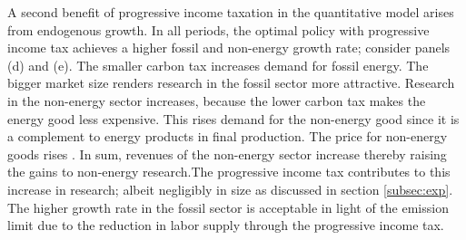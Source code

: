 A second benefit of progressive income taxation in the quantitative model arises from endogenous growth. 
In all periods, the optimal policy with progressive income tax achieves a higher fossil and non-energy growth rate; consider panels (d) and (e).
The smaller carbon tax increases demand for fossil energy. The bigger market size renders research in the fossil sector more attractive. Research in the non-energy sector increases, because the lower carbon tax makes the energy good less expensive. This rises demand for the non-energy good since it is a complement to energy products in final production. The price for non-energy goods rises . In sum, revenues of the non-energy sector increase thereby raising the gains to non-energy research.The progressive income tax contributes to this increase in research; albeit negligibly in size as discussed in section \ref{subsec:exp}.  The higher growth rate in the fossil sector is acceptable in light of the emission limit due to the reduction in labor supply through the progressive income tax. 




